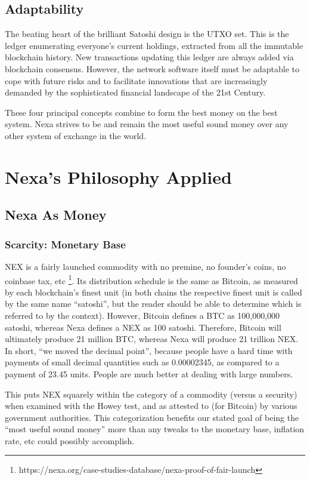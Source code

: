 \documentclass[a4paper, 11pt]{article}
\begin{document}
\subsection{Adaptability}
The beating heart of the brilliant Satoshi design is the UTXO set. This is the ledger enumerating everyone’s current holdings, extracted from all the immutable blockchain history. New transactions updating this ledger are always added via blockchain consensus. However, the network software itself must be adaptable to cope with future risks and to facilitate innovations that are increasingly demanded by the sophisticated financial landscape of the 21st Century.

These four principal concepts combine to form the best money on the best system. Nexa strives to be and remain the most useful sound money over any other system of exchange in the world.


\section{Nexa’s Philosophy Applied}
\subsection{Nexa As Money}
\subsubsection{Scarcity: Monetary Base}
NEX is a fairly launched commodity with no premine, no founder’s coins, no coinbase tax, etc \footnote{https://nexa.org/case-studies-database/nexa-proof-of-fair-launch}.  Its distribution schedule is the same as Bitcoin, as measured by each blockchain’s finest unit (in both chains the respective finest unit is called by the same name “satoshi”, but the reader should be able to determine which is referred to by the context).  However, Bitcoin defines a BTC as 100,000,000 satoshi, whereas Nexa defines a NEX as 100 satoshi.  Therefore, Bitcoin will ultimately produce 21 million BTC, whereas Nexa will produce 21 trillion NEX. In short, “we moved the decimal point”, because people have a hard time with payments of small decimal quantities such as 0.00002345, as compared to a payment of 23.45 units. People are much better at dealing with large numbers.

This puts NEX squarely within the category of a commodity (versus a security) when examined with the Howey test, and as attested to (for Bitcoin) by various government authorities.  This categorization benefits our stated goal of being the “most useful sound money” more than any tweaks to the monetary base, inflation rate, etc could possibly accomplish.
\end{document}
